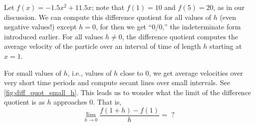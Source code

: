 Let $f(x) = -1.5x^2+11.5x$; note that $f(1)=10$ and $f(5) = 20$, as in our discussion. We can compute this difference quotient for all values of $h$ (even negative values!) except $h=0$, for then we get ``0/0,'' the indeterminate form introduced earlier. For all values $h\neq 0$, the difference quotient computes the average velocity of the particle over an interval of time of length $h$ starting at $x=1$. 

For small values of $h$, i.e., values of $h$ close to 0, we get average velocities over very short time periods and compute secant lines over small intervals. See \autoref{fig:diff_quot_small_h}. This leads us to wonder what the limit of the difference quotient is as $h$ approaches 0. That is,\vspace{-.3\baselineskip}
\[\lim_{h\to 0} \frac{f(1+h)-f(1)}{h} = \text{ ? }\]
%
